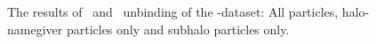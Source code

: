 \begin{subfigures}
\begin{figure}[!htbp]
{\begin{tabular}{|p{.5cm} c c|}
			\hline
		\end{tabular}
		\caption{\label{fig:dice_two_results_b}
			The results of \neigh\ and \iter\ unbinding of the \dt-dataset: All particles, halo-namegiver particles only and subhalo particles only.
			}
		}
	\end{figure}
	\label{fig:dice_two_results}
\end{subfigures}




